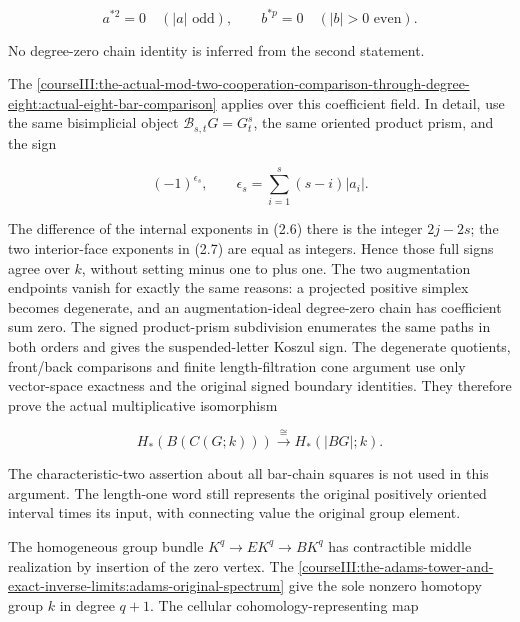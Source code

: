 \begin{equation}
a^{\ast2}=0\quad (|a|\text{ odd}),\qquad
 b^{\ast p}=0\quad (|b|>0\text{ even}).
 \label{courseIII:the-original-odd-prime-cooperations-and-degree-six-adams-calculation:eq:2.1}
\end{equation}

No degree-zero chain identity is inferred from the second statement.

The \cref{courseIII:the-actual-mod-two-cooperation-comparison-through-degree-eight:actual-eight-bar-comparison} applies over this coefficient field. In detail, use the same bisimplicial object \(\mathcal B_{s,t}G=G_t^s\), the same oriented product prism, and the sign

\begin{equation}
(-1)^{\epsilon_s},\qquad
 \epsilon_s=\sum_{i=1}^s(s-i)|a_i|.
 \label{courseIII:the-original-odd-prime-cooperations-and-degree-six-adams-calculation:eq:2.2}
\end{equation}

The difference of the internal exponents in (2.6) there is the integer \(2j-2s\); the two interior-face exponents in (2.7) are equal as integers. Hence those full signs agree over \(k\), without setting minus one to plus one. The two augmentation endpoints vanish for exactly the same reasons: a projected positive simplex becomes degenerate, and an augmentation-ideal degree-zero chain has coefficient sum zero. The signed product-prism subdivision enumerates the same paths in both orders and gives the suspended-letter Koszul sign. The degenerate quotients, front/back comparisons and finite length-filtration cone argument use only vector-space exactness and the original signed boundary identities. They therefore prove the actual multiplicative isomorphism

\begin{equation}
H_*(B(C(G;k)))\xrightarrow{\cong}H_*(|BG|;k).
 \label{courseIII:the-original-odd-prime-cooperations-and-degree-six-adams-calculation:eq:2.3}
\end{equation}

The characteristic-two assertion about all bar-chain squares is not used in this argument. The length-one word still represents the original positively oriented interval times its input, with connecting value the original group element.

The homogeneous group bundle \(K^q\to EK^q\to BK^q\) has contractible middle realization by insertion of the zero vertex. The \cref{courseIII:the-adams-tower-and-exact-inverse-limits:adams-original-spectrum} give the sole nonzero homotopy group \(k\) in degree \(q+1\). The cellular cohomology-representing map

